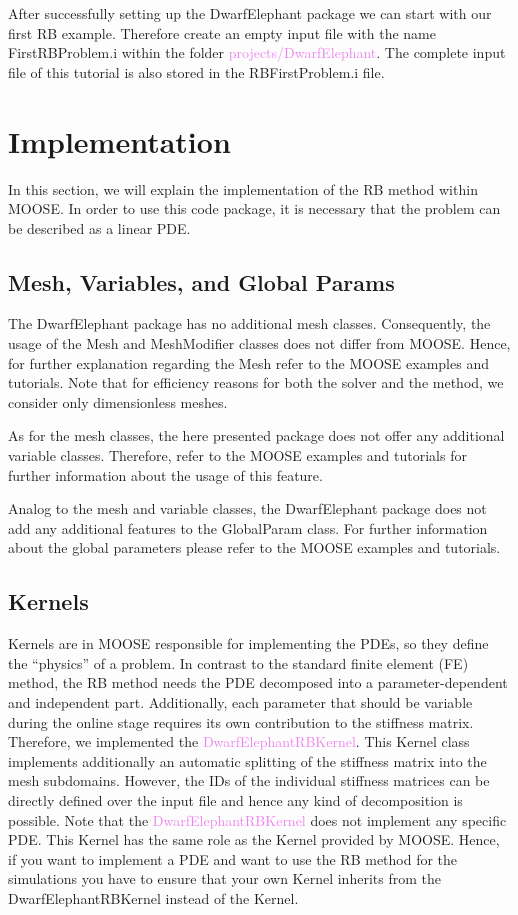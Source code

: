 \documentclass[11pt, a4paper, DIV=14]{scrartcl}
\begin{document}
After successfully setting up the DwarfElephant package we can start with our first RB example. Therefore create an empty input file with the name FirstRBProblem.i within the folder \textcolor{violet}{projects/DwarfElephant}. The complete input file of this tutorial is also stored in the RBFirstProblem.i file.

\section{Implementation} \label{Implementation}
In this section, we will explain the implementation of the RB method within MOOSE.  In order to use this code package, it is necessary that the problem can be described as a linear PDE.

\subsection{Mesh, Variables, and Global Params}
The DwarfElephant package has no additional mesh classes. Consequently, the usage of the Mesh and MeshModifier classes does not differ from MOOSE. Hence, for further explanation regarding the Mesh refer to the MOOSE examples and tutorials. Note that for efficiency reasons for both the solver and the method, we consider only dimensionless meshes.

As for the mesh classes, the here presented package does not offer any additional variable classes. Therefore, refer to the MOOSE examples and tutorials for further information about the usage of this feature.

Analog to the mesh and variable classes, the DwarfElephant package does not add any additional features to the GlobalParam class. For further information about the global parameters please refer to the MOOSE examples and tutorials.

\subsection{Kernels}
Kernels are in MOOSE responsible for implementing the PDEs, so they define the ``physics'' of a problem.  In contrast to the standard finite element (FE) method, the RB method needs the PDE decomposed into a parameter-dependent and independent part. Additionally, each parameter that should be variable during the online stage requires its own contribution to the stiffness matrix.  Therefore, we implemented the \textcolor{violet}{DwarfElephantRBKernel}. This Kernel class implements additionally an automatic splitting of the stiffness matrix into the mesh subdomains. However, the IDs of the individual stiffness matrices can be directly defined over the input file and hence any kind of decomposition is possible. Note that the  \textcolor{violet}{DwarfElephantRBKernel} does not implement any specific PDE. This Kernel has the same role as the Kernel provided by MOOSE. Hence, if you want to implement a PDE  and want to use the RB method for the simulations you have to ensure that your own Kernel inherits from the DwarfElephantRBKernel instead of the Kernel.
\end{document}
